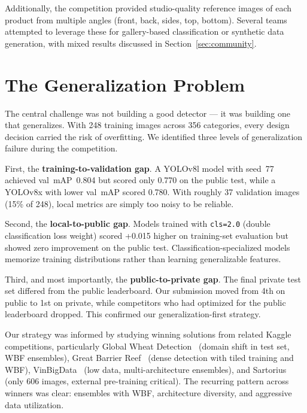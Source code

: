 \documentclass[11pt,a4paper]{article}
\begin{document}
Additionally, the competition provided studio-quality reference images of each product from multiple angles (front, back, sides, top, bottom).
Several teams attempted to leverage these for gallery-based classification or synthetic data generation, with mixed results discussed in Section~\ref{sec:community}.

\section{The Generalization Problem}
\label{sec:generalization}

The central challenge was not building a good detector --- it was building one that generalizes.
With 248 training images across 356 categories, every design decision carried the risk of overfitting.
We identified three levels of generalization failure during the competition.

First, the \textbf{training-to-validation gap}.
A YOLOv8l model with seed~77 achieved val~mAP~0.804 but scored only 0.770 on the public test, while a YOLOv8x with lower val~mAP scored 0.780.
With roughly 37 validation images (15\% of 248), local metrics are simply too noisy to be reliable.

Second, the \textbf{local-to-public gap}.
Models trained with \texttt{cls=2.0} (double classification loss weight) scored +0.015 higher on training-set evaluation but showed zero improvement on the public test.
Classification-specialized models memorize training distributions rather than learning generalizable features.

Third, and most importantly, the \textbf{public-to-private gap}.
The final private test set differed from the public leaderboard.
Our submission moved from 4th on public to 1st on private, while competitors who had optimized for the public leaderboard dropped.
This confirmed our generalization-first strategy.

Our strategy was informed by studying winning solutions from related Kaggle competitions, particularly Global Wheat Detection~\cite{david2020globalwheat} (domain shift in test set, WBF ensembles), Great Barrier Reef~\cite{gbr2021} (dense detection with tiled training and WBF), VinBigData~\cite{vinbigdata2021} (low data, multi-architecture ensembles), and Sartorius~\cite{sartorius2021} (only 606 images, external pre-training critical).
The recurring pattern across winners was clear: ensembles with WBF, architecture diversity, and aggressive data utilization.
\end{document}
